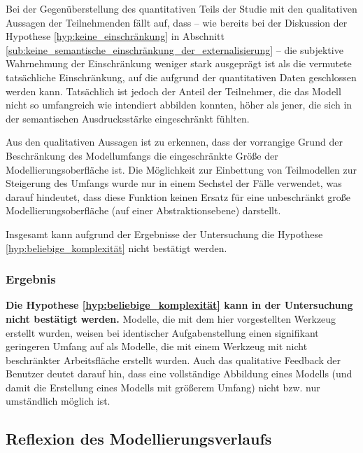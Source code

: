 Bei der Gegenüberstellung des quantitativen Teils der Studie mit den qualitativen Aussagen der Teilnehmenden fällt auf, dass -- wie bereits bei der Diskussion der Hypothese \ref{hyp:keine_einschränkung} in Abschnitt \ref{sub:keine_semantische_einschränkung_der_externalisierung} -- die subjektive Wahrnehmung der Einschränkung weniger stark ausgeprägt ist als die vermutete tatsächliche Einschränkung, auf die aufgrund der quantitativen Daten geschlossen werden kann. Tatsächlich ist jedoch der Anteil der Teilnehmer, die das Modell nicht so umfangreich wie intendiert abbilden konnten, höher als jener, die sich in der semantischen Ausdrucksstärke eingeschränkt fühlten.

Aus den qualitativen Aussagen ist zu erkennen, dass der vorrangige Grund der Beschränkung des Modellumfangs die eingeschränkte Größe der Modellierungsoberfläche ist. Die Möglichkeit zur Einbettung von Teilmodellen zur Steigerung des Umfangs wurde nur in einem Sechstel der Fälle verwendet, was darauf hindeutet, dass diese Funktion keinen Ersatz für eine unbeschränkt große Modellierungsoberfläche (auf einer Abstraktionsebene) darstellt.

Insgesamt kann aufgrund der Ergebnisse der Untersuchung die Hypothese \ref{hyp:beliebige_komplexität} nicht bestätigt werden.

\subsubsection{Ergebnis} %

\textbf{Die Hypothese \ref{hyp:beliebige_komplexität} kann in der Untersuchung nicht bestätigt werden.} Modelle, die mit dem hier vorgestellten Werkzeug erstellt wurden, weisen bei identischer Aufgabenstellung einen signifikant geringeren Umfang auf als Modelle, die mit einem Werkzeug mit nicht beschränkter Arbeitsfläche erstellt wurden. Auch das qualitative Feedback der Benutzer deutet darauf hin, dass eine vollständige Abbildung eines Modells (und damit die Erstellung eines Modells mit größerem Umfang) nicht bzw. nur umständlich möglich ist.



\subsection{Reflexion des Modellierungsverlaufs} %
\label{sub:reflexion_des_modellierungsverlaufs}


